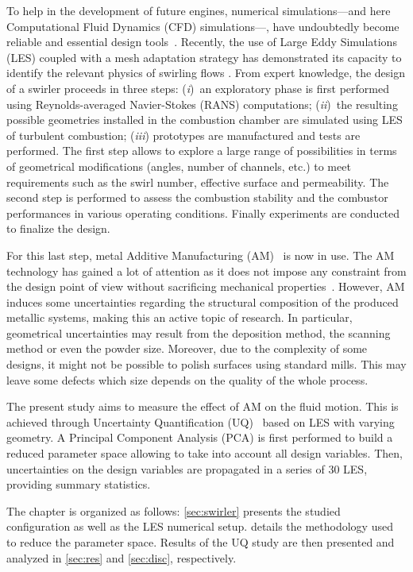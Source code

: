To help in the development of future engines, numerical simulations---and here Computational Fluid Dynamics (CFD) simulations---, have undoubtedly become reliable and essential design tools~\cite{Sacks1989,Forrester2009}. Recently, the use of Large Eddy Simulations (LES) coupled with a mesh adaptation strategy has demonstrated its capacity to identify the relevant physics of swirling flows \cite{Daviller2017}. %
From expert knowledge, the design of a swirler proceeds in three steps: (\emph{i})~an exploratory phase is first performed using Reynolds-averaged Navier-Stokes (RANS) computations; (\emph{ii})~the resulting possible geometries installed in the combustion chamber are simulated using LES of turbulent combustion; (\emph{iii}) prototypes are manufactured and tests are performed. The first step allows to explore a large range of possibilities in terms of geometrical modifications (angles, number of channels, etc.) to meet requirements such as the swirl number, effective surface and permeability. The second step is performed to assess the combustion stability and the combustor performances in various operating conditions. Finally experiments are conducted to finalize the design.

For this last step, metal Additive Manufacturing (AM)~\cite{Frazier2014,Sames2016} is now in use. The AM technology has gained a lot of attention as it does not impose any constraint from the design point of view without sacrificing mechanical properties~\cite{Lewandowski2016}. However, AM induces some uncertainties regarding the structural composition of the produced metallic systems, making this an active topic of research. In particular, geometrical uncertainties may result from the deposition method, the scanning method or even the powder size. Moreover, due to the complexity of some designs, it might not be possible to polish surfaces using standard mills. This may leave some defects which size depends on the quality of the whole process.

The present study aims to measure the effect of AM on the fluid motion. This is achieved through Uncertainty Quantification (UQ)~\cite{Iooss2015a} based on LES with varying geometry. A Principal Component Analysis (PCA) is first performed to build a reduced parameter space allowing to take into account all design variables. Then, uncertainties on the design variables are propagated in a series of 30 LES, providing summary statistics.

The chapter is organized as follows: \cref{sec:swirler} presents the studied configuration as well as the LES numerical setup.  details the methodology used to reduce the parameter space. Results of the UQ study are then presented and analyzed in  \cref{sec:res} and \cref{sec:disc}, respectively.

